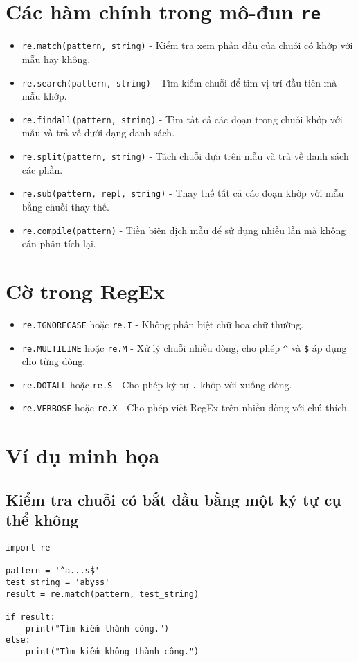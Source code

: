 \documentclass[a4paper,12pt]{article}
\begin{document}
\section*{Các hàm chính trong mô-đun \texttt{re}}
\begin{itemize}
    \item \texttt{re.match(pattern, string)} - Kiểm tra xem phần đầu của chuỗi có khớp với mẫu hay không.
    \item \texttt{re.search(pattern, string)} - Tìm kiếm chuỗi để tìm vị trí đầu tiên mà mẫu khớp.
    \item \texttt{re.findall(pattern, string)} - Tìm tất cả các đoạn trong chuỗi khớp với mẫu và trả về dưới dạng danh sách.
    \item \texttt{re.split(pattern, string)} - Tách chuỗi dựa trên mẫu và trả về danh sách các phần.
    \item \texttt{re.sub(pattern, repl, string)} - Thay thế tất cả các đoạn khớp với mẫu bằng chuỗi thay thế.
    \item \texttt{re.compile(pattern)} - Tiền biên dịch mẫu để sử dụng nhiều lần mà không cần phân tích lại.
\end{itemize}

\section*{Cờ trong RegEx}
\begin{itemize}
    \item \texttt{re.IGNORECASE} hoặc \texttt{re.I} - Không phân biệt chữ hoa chữ thường.
    \item \texttt{re.MULTILINE} hoặc \texttt{re.M} - Xử lý chuỗi nhiều dòng, cho phép \texttt{\^{}} và \texttt{\$} áp dụng cho từng dòng.
    \item \texttt{re.DOTALL} hoặc \texttt{re.S} - Cho phép ký tự \texttt{.} khớp với xuống dòng.
    \item \texttt{re.VERBOSE} hoặc \texttt{re.X} - Cho phép viết RegEx trên nhiều dòng với chú thích.
\end{itemize}

\section*{Ví dụ minh họa}
\subsection*{Kiểm tra chuỗi có bắt đầu bằng một ký tự cụ thể không}
\begin{lstlisting}
import re

pattern = '^a...s$'
test_string = 'abyss'
result = re.match(pattern, test_string)

if result:
    print("Tìm kiếm thành công.")
else:
    print("Tìm kiếm không thành công.")
\end{lstlisting}
\end{document}

